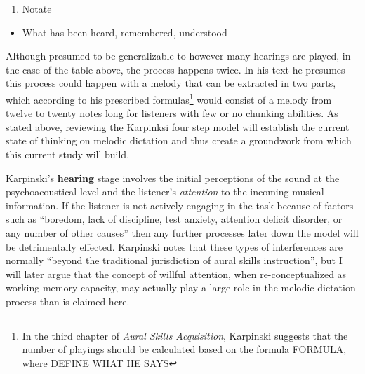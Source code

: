 \documentclass[]{book}
\providecommand{\tightlist}{%
  \setlength{\itemsep}{0pt}\setlength{\parskip}{0pt}}
\let\rmarkdownfootnote\footnote%
\def\footnote{\protect\rmarkdownfootnote}
\theoremstyle{definition}
\theoremstyle{definition}
\theoremstyle{definition}
\theoremstyle{remark}
\begin{document}
\begin{enumerate}
\def\labelenumi{\arabic{enumi}.}
\setcounter{enumi}{3}
\tightlist
\item
  Notate
\end{enumerate}

\begin{itemize}
\tightlist
\item
  What has been heard, remembered, understood
\end{itemize}

Although presumed to be generalizable to however many hearings are
played, in the case of the table above, the process happens twice. In
his text he presumes this process could happen with a melody that can be
extracted in two parts, which according to his prescribed
formulas\footnote{In the third chapter of \emph{Aural Skills
  Acquisition}, Karpinski suggests that the number of playings should be
  calculated based on the formula FORMULA, where DEFINE WHAT HE SAYS}
would consist of a melody from twelve to twenty notes long for listeners
with few or no chunking abilities. As stated above, reviewing the
Karpinksi four step model will establish the current state of thinking
on melodic dictation and thus create a groundwork from which this
current study will build.

Karpinski's \textbf{hearing} stage involves the initial perceptions of
the sound at the psychoacoustical level and the listener's
\emph{attention} to the incoming musical information. If the listener is
not actively engaging in the task because of factors such as ``boredom,
lack of discipline, test anxiety, attention deficit disorder, or any
number of other causes'' then any further processes later down the model
will be detrimentally effected. Karpinski notes that these types of
interferences are normally ``beyond the traditional jurisdiction of
aural skills instruction'', but I will later argue that the concept of
willful attention, when re-conceptualized as working memory capacity,
may actually play a large role in the melodic dictation process than is
claimed here.
\end{document}
